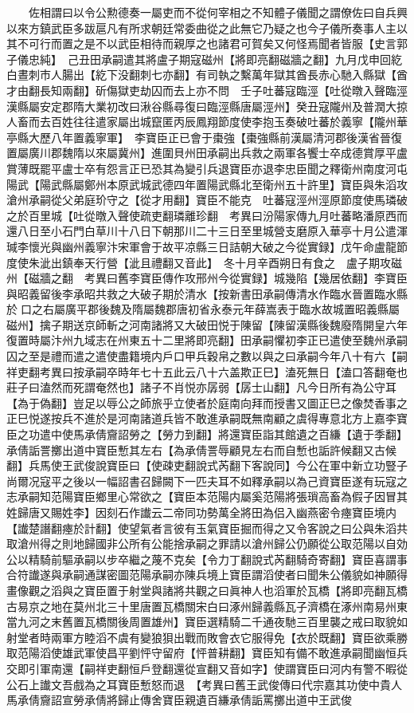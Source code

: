 　　佐相謂曰以令公勲德奏一屬吏而不從何宰相之不知體子儀聞之謂僚佐曰自兵興以來方鎮武臣多跋扈凡有所求朝廷常委曲從之此無它乃疑之也今子儀所奏事人主以其不可行而置之是不以武臣相待而親厚之也諸君可賀矣又何怪焉聞者皆服【史言郭子儀忠純】　己丑田承嗣遣其將盧子期寇磁州【將即亮翻磁牆之翻】九月戊申回紇白晝刺市人腸出【紇下没翻刺七亦翻】有司執之繫萬年獄其酋長赤心馳入縣獄【酋才由翻長知兩翻】斫傷獄吏劫囚而去上亦不問　壬子吐蕃寇臨涇【吐從暾入聲臨涇漢縣屬安定郡隋大業初改曰湫谷縣尋復曰臨涇縣唐屬涇州】癸丑寇隴州及普潤大掠人畜而去百姓往往遣家屬出城竄匿丙辰鳳翔節度使李抱玉奏破吐蕃於義寧【隴州華亭縣大歷八年置義寧軍】　李寶臣正已會于棗強【棗強縣前漢屬清河郡後漢省晉復置屬廣川郡魏隋以來屬冀州】進圍貝州田承嗣出兵救之兩軍各饗士卒成德賞厚平盧賞薄既罷平盧士卒有怨言正已恐其為變引兵退寶臣亦退李忠臣聞之釋衛州南度河屯陽武【陽武縣屬鄭州本原武城武德四年置陽武縣北至衛州五十許里】寶臣與朱滔攻滄州承嗣從父弟庭玠守之【從才用翻】寶臣不能克　吐蕃寇涇州涇原節度使馬璘破之於百里城【吐從暾入聲使疏吏翻璘離珍翻　考異曰汾陽家傳九月吐蕃略潘原西而還八日至小石門白草川十八日下朝那川二十三日至里城營支磨原入華亭十月公遣渾瑊李懷光與幽州義寧汴宋軍會于故平凉縣三日詰朝大破之今從實録】戊午命盧龍節度使朱泚出鎮奉天行營【泚且禮翻又音此】　冬十月辛酉朔日有食之　盧子期攻磁州【磁牆之翻　考異曰舊李寶臣傳作攻邢州今從實録】城幾陷【幾居依翻】李寶臣與昭義留後李承昭共救之大破子期於清水【按新書田承嗣傳清水作臨水晉置臨水縣於口之右屬廣平郡後魏及隋屬魏郡唐初省永泰元年薛嵩表于臨水故城置昭義縣屬磁州】擒子期送京師斬之河南諸將又大破田悦于陳留【陳留漢縣後魏廢隋開皇六年復置時屬汴州九域志在州東五十二里將即亮翻】田承嗣懼初李正已遣使至魏州承嗣囚之至是禮而遣之遣使盡籍境内戶口甲兵穀帛之數以與之曰承嗣今年八十有六【嗣祥吏翻考異曰按承嗣卒時年七十五此云八十六盖欺正巳】溘死無日【溘口答翻奄也莊子曰溘然而死謂奄然也】諸子不肖悦亦孱弱【孱士山翻】凡今日所有為公守耳【為于偽翻】豈足以辱公之師旅乎立使者於庭南向拜而授書又圖正巳之像焚香事之正巳悦遂按兵不進於是河南諸道兵皆不敢進承嗣既無南顧之虞得專意北方上嘉李寶臣之功遣中使馬承倩齎詔勞之【勞力到翻】將還寶臣詣其館遺之百縑【遺于季翻】承倩詬詈擲出道中寶臣慙其左右【為承倩詈辱顧見左右而自慙也詬許候翻又古候翻】兵馬使王武俊說寶臣曰【使疎吏翻說式芮翻下客說同】今公在軍中新立功豎子尚爾况寇平之後以一幅詔書召歸闕下一匹夫耳不如釋承嗣以為己資寶臣遂有玩寇之志承嗣知范陽寶臣鄉里心常欲之【寶臣本范陽内屬奚范陽將張瑣高畜為假子因冒其姓歸唐又賜姓李】因刻石作䜟云二帝同功勢萬全將田為侣入幽燕密令瘞寶臣境内【䜟楚譖翻瘞於計翻】使望氣者言彼有玉氣寶臣掘而得之又令客說之曰公與朱滔共取滄州得之則地歸國非公所有公能捨承嗣之罪請以滄州歸公仍願從公取范陽以自効公以精騎前驅承嗣以步卒繼之蔑不克矣【令力丁翻說式芮翻騎奇寄翻】寶臣喜謂事合符䜟遂與承嗣通謀密圖范陽承嗣亦陳兵境上寶臣謂滔使者曰聞朱公儀貌如神願得畫像觀之滔與之寶臣置于射堂與諸將共觀之曰眞神人也滔軍於瓦橋【將即亮翻瓦橋古易京之地在莫州北三十里唐置瓦橋關宋白曰涿州歸義縣瓦子濟橋在涿州南易州東當九河之末舊置瓦橋關後周置雄州】寶臣選精騎二千通夜馳三百里襲之戒曰取貌如射堂者時兩軍方睦滔不虞有變狼狽出戰而敗會衣它服得免【衣於既翻】寶臣欲乘勝取范陽滔使雄武軍使昌平劉怦守留府【怦普耕翻】寶臣知有備不敢進承嗣聞幽恒兵交即引軍南還【嗣祥吏翻恒戶登翻還從宣翻又音如字】使謂寶臣曰河内有警不暇從公石上䜟文吾戲為之耳寶臣慙怒而退　【考異曰舊王武俊傳曰代宗嘉其功使中貴人馬承倩齎詔宣勞承倩將歸止傳舍寶臣親遺百縑承倩詬罵擲出道中王武俊